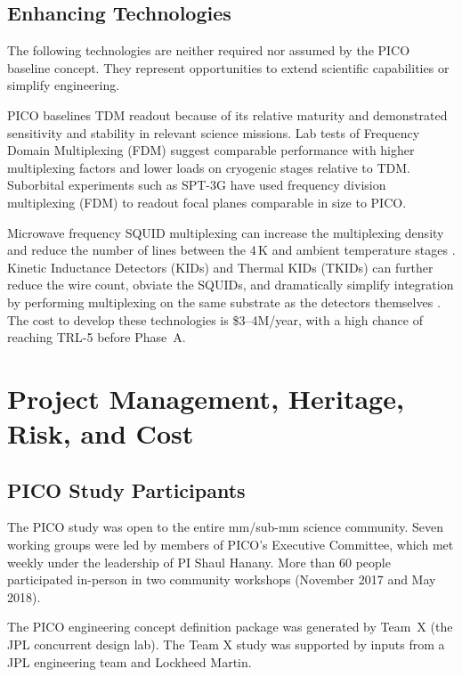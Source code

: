 \subsection{Enhancing Technologies}
\label{sec:enhancing_technologies} %

The following technologies are neither required nor assumed by the
PICO baseline concept. They represent opportunities to extend
scientific capabilities or simplify engineering.

PICO baselines TDM readout because of its relative maturity and
demonstrated sensitivity and stability in relevant science
missions. Lab tests of Frequency Domain Multiplexing (FDM) suggest
comparable performance with higher multiplexing factors and lower
loads on cryogenic stages relative to TDM. Suborbital experiments such
as SPT-3G have used frequency division multiplexing (FDM) to readout
focal planes comparable in size to PICO.

Microwave frequency SQUID multiplexing can increase the multiplexing
density and reduce the number of lines between the 4\,K and ambient
temperature stages \citep{Dober2017,Irwin2004}. Kinetic Inductance
Detectors (KIDs) and Thermal KIDs (TKIDs) can further reduce the wire
count, obviate the SQUIDs, and dramatically simplify integration by
performing multiplexing on the same substrate as the detectors
themselves \citep{McCarrick2016,Steinbach2018}. The cost to develop
these technologies is \$3--4M/year, with a high chance of reaching
TRL-5 before Phase~A.

\bigskip
\section{Project Management, Heritage, Risk, and Cost}
\label{sec:project_management} %

\subsection{PICO Study Participants}
\label{sec:study_participants} %

The PICO study was open to the entire mm/sub-mm science community. 
Seven working groups were led by
members of PICO's Executive Committee, which met weekly under the
leadership of PI Shaul Hanany. More than 60 people participated
in-person in two community workshops (November 2017 and May 2018).

The PICO engineering concept definition package was generated by
Team~X (the JPL concurrent design lab). The Team X study was supported
by inputs from a JPL engineering team and Lockheed Martin.

